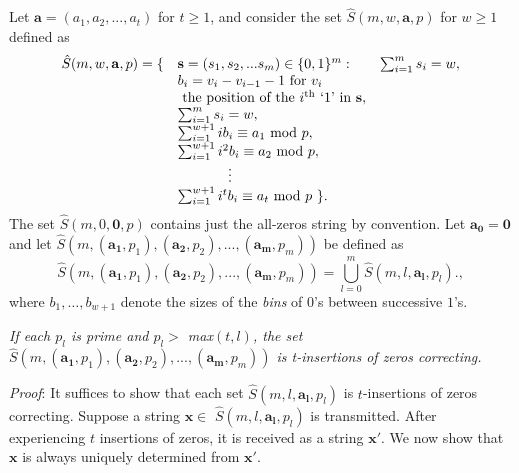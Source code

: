 Let $\mathbf{a}=\left(a_1,a_2,...,a_t\right)$ for $t \geq 1$, and
consider the set $\hat{S}(m,w,\mathbf{a},p)$ for $w \geq 1$
defined as
\begin{equation}\label{exten}\begin{array}{lll}\hat{S}(m,w,\mathbf{a},p) = \{ & \mathbf{s}=(s_1, s_2, ... s_m) \in \{0,1\}^m
:{} & \sum_{i=1}^m s_i = w,\\{} & b_i=v_i-v_{i-1}-1 \text{ for } v_i \\ {} &  \text{ the position of the } i^{\text{th} }\text{ `1' in } \mathbf{s},\\
{} & \sum_{i=1}^m s_i = w,\\
{} & \sum_{i=1}^{w+1} ib_i \equiv a_1 \text{ mod } p,\\ {} &
\sum_{i=1}^{w+1} i^2b_i
\equiv a_2 \text{ mod } p,\\
{} & \hspace{0.5in}\vdots\\ {} & \sum_{i=1}^{w+1} i^tb_i \equiv
a_t \text{ mod } p~\}.\end{array}\end{equation} The set
$\hat{S}(m,0,\mathbf{0},p)$ contains just the all-zeros string by
convention. Let $\mathbf{a_0} = \mathbf{0}$ and let
$\hat{S}\left(m,(\mathbf{a_1},p_1),(\mathbf{a_2},p_2),...,(\mathbf{a_m},p_m)\right)$
be defined as
\begin{equation}\label{union}\hat{S}\left(m,(\mathbf{a_1},p_1),(\mathbf{a_2},p_2),...,(\mathbf{a_m},p_m)\right)=
\bigcup_{l=0}^{m} \hat{S}(m,l,\mathbf{a_l},p_l).,\end{equation}
where $b_1, \ldots, b_{w+1}$ denote the sizes of the {\em bins} of
$0$'s between successive $1$'s.

\begin{lemma}\label{multproof}\textit{If each $p_l$ is prime and $p_l >$
max$(t,l)$, the set
$\hat{S}\left(m,(\mathbf{a_1},p_1),(\mathbf{a_2},p_2),...,(\mathbf{a_m},p_m)\right)$
is t-insertions of zeros correcting.}\end{lemma}



\textit{Proof}: It suffices to show that each set
$\hat{S}(m,l,\mathbf{a_l},p_l)$ is $t$-insertions of zeros
correcting. Suppose a string $\mathbf{x} \in$
$\hat{S}(m,l,\mathbf{a_l},p_l)$ is transmitted. After experiencing
$t$ insertions of zeros, it is received as a string $\mathbf{x'}$.
We now show that $\mathbf{x}$ is always uniquely determined from
$\mathbf{x'}$.


